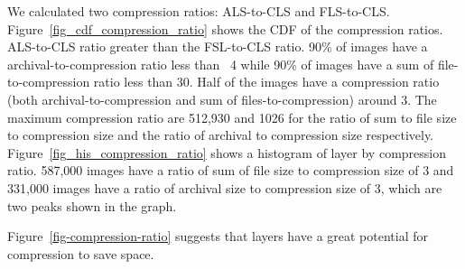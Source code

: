 We calculated two compression ratios: ALS-to-CLS and FLS-to-CLS.
Figure~\ref{fig_cdf_compression_ratio} shows the CDF of the compression ratios.
%
ALS-to-CLS ratio greater than the FSL-to-CLS ratio.
%
90\% of images have a archival-to-compression ratio less than ~4 while 90\% of
images have a sum of file-to-compression ratio less than 30.
%
Half of the images have a compression ratio (both archival-to-compression and
sum of files-to-compression) around 3.
%
The maximum compression ratio are 512,930 and 1026 for the ratio of sum to file
size to compression size and the ratio of archival to compression size
respectively.
%
Figure~\ref{fig_his_compression_ratio} shows a histogram of layer by
compression ratio.
%
587,000 images have a ratio of sum of file size to compression size of 3 and
331,000 images have a ratio of archival size to compression size of 3, which
are two peaks shown in the graph.

Figure~\ref{fig-compression-ratio} suggests that layers have a great potential
for compression to save space.


